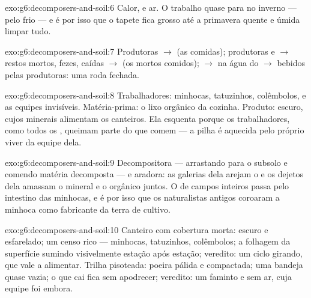 \begin{solution}{exo:g6:decomposers-and-soil:6}
Calor,  e ar. O trabalho quase para no inverno --- pelo frio
--- e é por isso que o tapete fica grosso até a primavera quente e
úmida limpar tudo.
\end{solution}

\begin{solution}{exo:g6:decomposers-and-soil:7}
Produtoras $\rightarrow$  (as  comidas);
produtoras e  $\rightarrow$ restos mortos, fezes, 
caídas $\rightarrow$  (os mortos comidos);
 $\rightarrow$  na água do 
$\rightarrow$ bebidos pelas produtoras: uma roda fechada.
\end{solution}

\begin{solution}{exo:g6:decomposers-and-soil:8}
Trabalhadores: minhocas, tatuzinhos, colêmbolos,  e as equipes
invisíveis. Matéria-prima: o lixo orgânico da cozinha. Produto: 
escuro, cujos minerais alimentam os canteiros. Ela esquenta porque os
trabalhadores, como todos os , queimam parte do que
comem --- a pilha é aquecida pelo próprio viver da equipe dela.
\end{solution}

\begin{solution}{exo:g6:decomposers-and-soil:9}
Decompositora --- arrastando  para o subsolo e comendo matéria
decomposta --- e aradora: as galerias dela arejam o  e os dejetos
dela amassam o mineral e o orgânico juntos. O  de campos inteiros
passa pelo intestino das minhocas, e é por isso que os naturalistas
antigos coroaram a minhoca como fabricante da terra de cultivo.
\end{solution}

\begin{solution}{exo:g6:decomposers-and-soil:10}
Canteiro com cobertura morta:  escuro e esfarelado; um censo
rico --- minhocas, tatuzinhos, colêmbolos; a folhagem da superfície
sumindo visivelmente estação após estação; veredito: um ciclo girando,
que vale a  alimentar. Trilha pisoteada: poeira pálida e
compactada; uma bandeja quase vazia; o que cai fica sem apodrecer;
veredito: um  faminto e sem ar, cuja equipe foi embora.
\end{solution}

